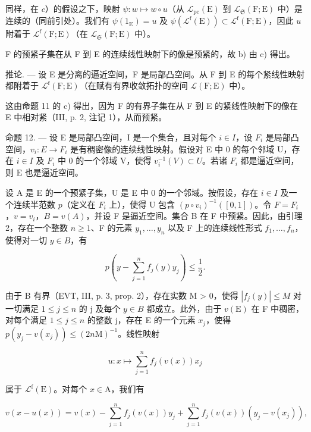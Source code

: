 同样，在 \(c\)）的假设之下，映射 \(\psi: w \mapsto w \circ u\)（从 \(\mathcal{L}_{\mathrm{pc}}(\mathrm{E})\) 到 \(\mathcal{L}_{\mathfrak{S}}(\mathrm{F};\mathrm{E})\) 中）是连续的（同前引处）。我们有 \(\psi(1_{\mathrm{E}}) = u\) 及 \(\psi(\mathcal{L}^{\mathrm{f}}(\mathrm{E})) \subset \mathcal{L}^{\mathrm{f}}(\mathrm{F};\mathrm{E})\)，因此 \(u\) 附着于 \(\mathcal{L}^{\mathrm{f}}(\mathrm{F};\mathrm{E})\)（在 \(\mathcal{L}_{\mathfrak{S}}(\mathrm{F};\mathrm{E})\) 中）。

F 的预紧子集在从 F 到 E 的连续线性映射下的像是预紧的，故 b) 由 c) 得出。

推论. --- 设 E 是分离的逼近空间，F 是局部凸空间。从 F 到 E 的每个紧线性映射都附着于 \(\mathcal{L}^{\mathrm{f}}(\mathrm{F};\mathrm{E})\)（在赋有有界收敛拓扑的空间 \(\mathcal{L}(\mathrm{F};\mathrm{E})\) 中）。

这由命题 11 的 c) 得出，因为 F 的有界子集在从 F 到 E 的紧线性映射下的像在 E 中相对紧（III, p. 2, 注记 1），从而预紧。

命题 12. --- 设 E 是局部凸空间，I 是一个集合，且对每个 \(i \in I\)，设 \(F_{i}\) 是局部凸空间，\(v_{i}: E \to F_{i}\) 是有稠密像的连续线性映射。假设对 E 中 0 的每个邻域 U，存在 \(i \in I\) 及 \(F_{i}\) 中 0 的一个邻域 V，使得 \(v_{i}^{-1}(V) \subset U\)。若诸 \(F_{i}\) 都是逼近空间，则 E 也是逼近空间。

设 A 是 E 的一个预紧子集，U 是 E 中 0 的一个邻域。按假设，存在 \(i \in I\) 及一个连续半范数 \(p\)（定义在 \(F_i\) 上），使得 U 包含 \((p \circ v_i)^{-1}([0,1])\)。令 \(F = F_i\)，\(v = v_i\)，\(B = v(A)\)，并设 F 是逼近空间。集合 B 在 F 中预紧。因此，由引理 2，存在一个整数 \(n \geqslant 1\)、F 的元素 \(y_1, \ldots, y_n\) 以及 F 上的连续线性形式 \(f_1, \ldots, f_n\)，使得对一切 \(y \in B\)，有

\[
p \left(y - \sum_ {j = 1} ^ {n} f _ {j} (y) y _ {j}\right) \leqslant \frac {1}{2}.
\]

由于 B 有界（EVT, III, p. 3, prop. 2），存在实数 M > 0，使得 \(|f_{j}(y)| \leqslant M\) 对一切满足 \(1 \leqslant j \leqslant n\) 的 j 及每个 \(y \in B\) 都成立。此外，由于 \(v(\mathrm{E})\) 在 F 中稠密，对每个满足 \(1 \leqslant j \leqslant n\) 的整数 j，存在 E 的一个元素 \(x_{j}\)，使得 \(p(y_{j} - v(x_{j})) \leqslant (2n\mathrm{M})^{-1}\)。线性映射

\[
u \colon x \longmapsto \sum_ {j = 1} ^ {n} f _ {j} (v (x)) x _ {j}
\]

属于 \(\mathcal{L}^{\mathrm{f}}(\mathrm{E})\)。对每个 \(x\in \mathrm{A}\)，我们有

\[
v (x - u (x)) = v (x) - \sum_ {j = 1} ^ {n} f _ {j} (v (x)) y _ {j} + \sum_ {j = 1} ^ {n} f _ {j} (v (x)) \left(y _ {j} - v \left(x _ {j}\right)\right),
\]

